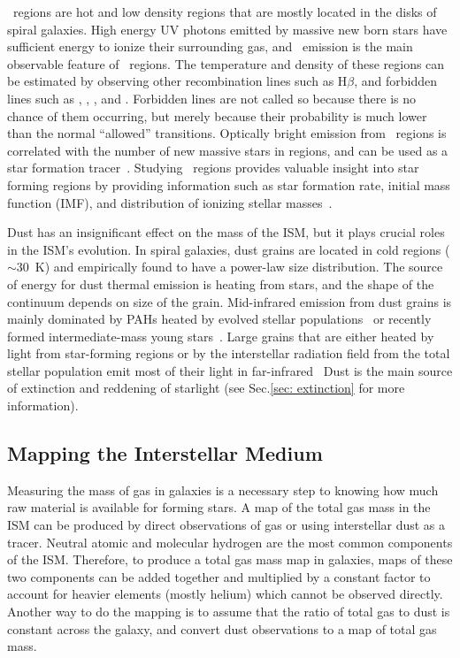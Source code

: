 \hii~regions are hot and low density regions that are mostly located in the disks of spiral galaxies.
High energy UV photons emitted by massive new born stars have sufficient energy to ionize their surrounding gas, and
~\halpha emission is the main observable feature of \hii~regions.
The temperature and density of these regions can be estimated by observing other recombination lines such as H$\beta$, and forbidden lines such as \sii, \oii, \oiii, and \nii. 
Forbidden lines are not called so because there is no chance of them occurring, but merely because their probability is much lower than the normal ``allowed'' transitions.
Optically bright \halpha emission from \hii~regions is correlated with the number of new massive stars in regions, and can be used as a star formation tracer~\citep[e.g.][]{Kennicutt98b,Calzetti13}.
Studying \hii~regions provides valuable insight into star forming regions by providing information such as star formation rate, initial mass function (IMF), and distribution of ionizing stellar masses~\citep[][and references therein]{Azimlu11}.


Dust has an insignificant effect on the mass of the ISM, but it plays crucial roles in the ISM's evolution.
In spiral galaxies, dust grains are located in cold regions ($\sim$30~K) and empirically found to have a power-law size distribution.
The source of energy for dust thermal emission is heating from stars, and the shape of the continuum depends on size of the grain.
Mid-infrared emission from dust grains is mainly dominated by PAHs heated by evolved stellar populations~\citep{Smith07a} or recently formed intermediate-mass young stars~\citep{Peeters04}.
Large grains that are either heated by light from star-forming regions or by the interstellar radiation field from the total stellar population emit most of their light in far-infrared~\citep[e.g.][]{Calapa14, lu14}
Dust is the main source of extinction and reddening of starlight (see Sec.\ref{sec: extinction} for more information).

\subsection{Mapping the Interstellar Medium} 
\label{sec: ismmap}
Measuring the mass of gas in galaxies is a necessary step to knowing how much raw material is available for forming stars.
A map of the total gas mass in the ISM can be produced by direct observations of gas or using interstellar dust as a tracer. 
Neutral atomic and molecular hydrogen are the most common components of the ISM. 
Therefore, to produce a total gas mass map in galaxies, maps of these two components can be added together and multiplied by a constant factor to account for heavier elements (mostly helium) which cannot be observed directly. 
Another way to do the mapping is to assume that the ratio of total gas to dust is constant across the galaxy, and convert dust observations to a map of total gas mass.

